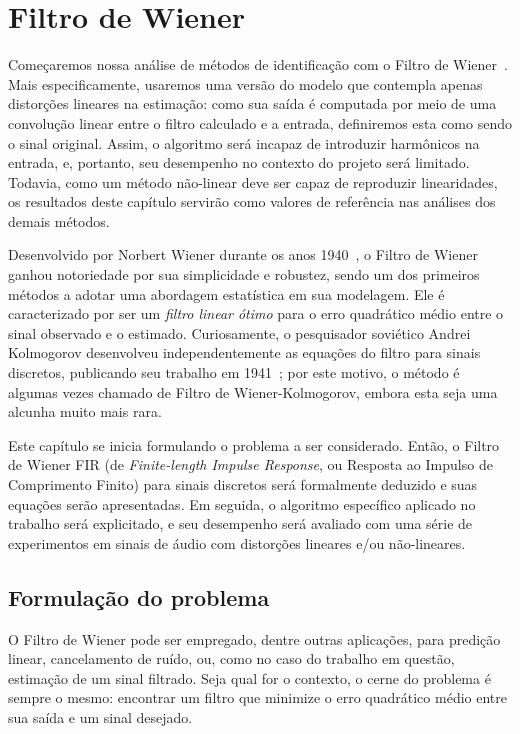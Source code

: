 \chapter{Filtro de Wiener}
\label{chapter:wiener}

Começaremos nossa análise de métodos de identificação com o Filtro de
Wiener~\cite{hayes-1996}. Mais especificamente, usaremos uma versão do modelo que
contempla apenas distorções lineares na estimação: como sua saída é computada por meio
de uma convolução linear entre o filtro calculado e a entrada, definiremos esta como
sendo o sinal original. Assim, o algoritmo será incapaz de introduzir harmônicos na
entrada, e, portanto, seu desempenho no contexto do projeto será limitado. Todavia,
como um método não-linear deve ser capaz de reproduzir linearidades, os resultados
deste capítulo servirão como valores de referência nas análises dos demais métodos.

Desenvolvido por Norbert Wiener durante os anos 1940~\cite{wiener-1949}, o Filtro de
Wiener ganhou notoriedade por sua simplicidade e robustez, sendo um dos primeiros
métodos a adotar uma abordagem estatística em sua modelagem. Ele é caracterizado por
ser um \emph{filtro linear ótimo} para o erro quadrático médio entre o sinal observado
e o estimado. Curiosamente, o pesquisador soviético Andrei Kolmogorov desenvolveu
independentemente as equações do filtro para sinais discretos, publicando seu trabalho
em 1941~\cite{kolmogorov-1941}; por este motivo, o método é algumas vezes chamado de
Filtro de Wiener-Kolmogorov, embora esta seja uma alcunha muito mais rara.

Este capítulo se inicia formulando o problema a ser considerado. Então, o Filtro de
Wiener FIR (de \textit{Finite-length Impulse Response}, ou Resposta ao Impulso de
Comprimento Finito) para sinais discretos será formalmente deduzido e suas equações
serão apresentadas. Em seguida, o algoritmo específico aplicado no trabalho será
explicitado, e seu desempenho será avaliado com uma série de experimentos em sinais de
áudio com distorções lineares e/ou não-lineares.

\section{Formulação do problema}
\label{section:wiener:wiener-model}

O Filtro de Wiener pode ser empregado, dentre outras aplicações, para predição linear,
cancelamento de ruído, ou, como no caso do trabalho em questão, estimação de um sinal
filtrado. Seja qual for o contexto, o cerne do problema é sempre o mesmo: encontrar um
filtro que minimize o erro quadrático médio entre sua saída e um sinal desejado.

